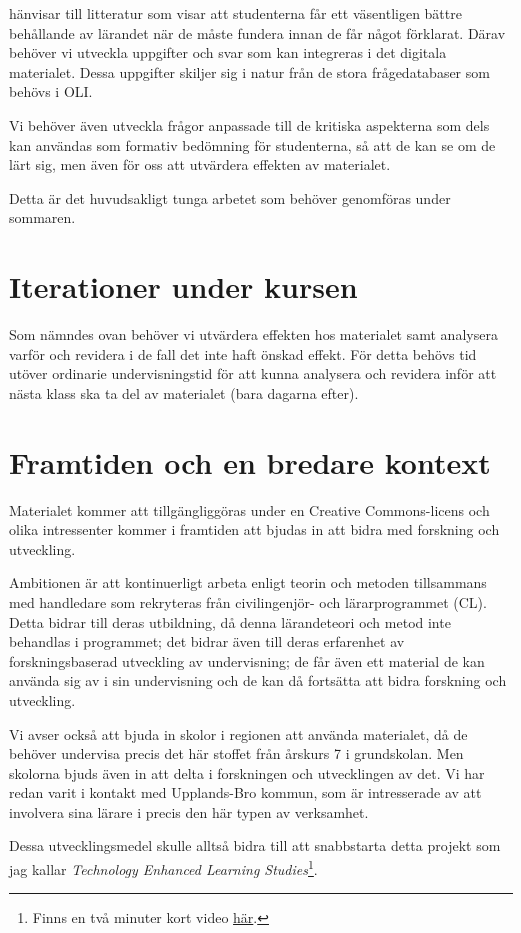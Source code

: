 \documentclass[a4paper,swedish]{article}
\begin{document}
\Textcite{NecessaryConditionsOfLearning} hänvisar till litteratur som visar att 
studenterna får ett väsentligen bättre behållande av lärandet när de måste 
fundera innan de får något förklarat.
Därav behöver vi utveckla uppgifter och svar som kan integreras i det digitala 
materialet.
Dessa uppgifter skiljer sig i natur från de stora frågedatabaser som behövs i 
OLI.

Vi behöver även utveckla frågor anpassade till de kritiska aspekterna som dels 
kan användas som formativ bedömning för studenterna, så att de kan se om de 
lärt sig, men även för oss att utvärdera effekten av materialet.

Detta är det huvudsakligt tunga arbetet som behöver genomföras under sommaren.


\section{Iterationer under kursen}\label{iterationer}

Som nämndes ovan behöver vi utvärdera effekten hos materialet samt analysera 
varför och revidera i de fall det inte haft önskad effekt.
För detta behövs tid utöver ordinarie undervisningstid för att kunna analysera 
och revidera inför att nästa klass ska ta del av materialet (bara dagarna 
efter).


\section*{Framtiden och en bredare kontext}

Materialet kommer att tillgängliggöras under en Creative Commons-licens och 
olika intressenter kommer i framtiden att bjudas in att bidra med forskning och 
utveckling.

Ambitionen är att kontinuerligt arbeta enligt teorin och metoden tillsammans 
med handledare som rekryteras från civilingenjör- och lärarprogrammet (CL).
Detta bidrar till deras utbildning, då denna lärandeteori och metod inte 
behandlas i programmet; det bidrar även till deras erfarenhet av 
forskningsbaserad utveckling av undervisning; de får även ett material de kan 
använda sig av i sin undervisning och de kan då fortsätta att bidra forskning 
och utveckling.

Vi avser också att bjuda in skolor i regionen att använda materialet, då de 
behöver undervisa precis det här stoffet från årskurs 7 i grundskolan.
Men skolorna bjuds även in att delta i forskningen och utvecklingen av det.
Vi har redan varit i kontakt med Upplands-Bro kommun, som är intresserade av 
att involvera sina lärare i precis den här typen av verksamhet.

Dessa utvecklingsmedel skulle alltså bidra till att snabbstarta detta projekt 
som jag kallar \emph{Technology Enhanced Learning Studies}\footnote{%
  Finns en två minuter kort video \href{https://youtu.be/uByy1fJ0Yro}{här}.
}.


\printbibliography
\end{document}
